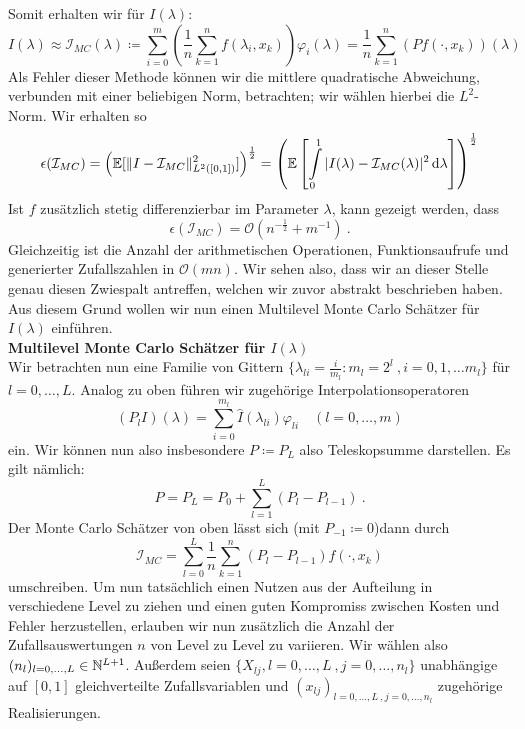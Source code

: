 \begin{Beispiel}
	Somit erhalten wir für $ I(\lambda) $:
	\[
		I(\lambda) \approx \mathcal{I}_{MC}(\lambda) \coloneqq \sum_{i=0}^{m} \left( \frac{1}{n}\sum_{k=1}^{n} f(\lambda_i, x_k)\right) \varphi_i (\lambda) = \frac{1}{n} \sum_{k=1}^{n} (Pf(\cdot,x_k))(\lambda)
	\]
	Als Fehler dieser Methode können wir die mittlere quadratische Abweichung, verbunden mit einer beliebigen Norm, betrachten; wir wählen hierbei die $ L^2 $-Norm.
	Wir erhalten so 
	\[ 
	\epsilon(\mathcal{I}_{MC})  = \left( \mathbb{E} [\lVert I -  \mathcal{I}_{MC} \rVert_{L^2([0,1])}^2] \right)^{\frac{1}{2}} = \left( \mathbb{E} \left[ \int\limits_{0}^{1} | I(\lambda) - \mathcal{I}_{MC}(\lambda) |^2 \, \mathrm{d} \lambda \right] \right)^{\frac{1}{2}}
	\]
	Ist $ f $ zusätzlich stetig differenzierbar im Parameter $ \lambda $, kann gezeigt werden, dass 
	\[
		\epsilon(\mathcal{I}_{MC}) = \mathcal{O}(n^{-\frac{1}{2}}+m^{-1}) \ .
	\]
	Gleichzeitig ist die Anzahl der arithmetischen Operationen, Funktionsaufrufe und generierter Zufallszahlen in $ \mathcal{O}(mn) $.
	Wir sehen also, dass wir an dieser Stelle genau diesen Zwiespalt antreffen, welchen wir zuvor abstrakt beschrieben haben. Aus diesem Grund wollen wir nun einen Multilevel Monte Carlo Schätzer für $ I(\lambda) $ einführen.\\	
	\newline
	\textbf{Multilevel Monte Carlo Schätzer für $ I(\lambda) $}\\
	Wir betrachten nun eine Familie von Gittern $ \{ \lambda_{li} = \frac{i}{m_l} : m_l = 2^l \ , i=0,1,\dots m_l \} $ für $ l = 0,\dots,L $.
	Analog zu oben führen wir zugehörige Interpolationsoperatoren 
	\[
	 (P_l I)(\lambda) = \sum_{i=0}^{m_l} \hat{I}(\lambda_{li}) \varphi_{li} \quad (l = 0,\dots,m)
	 \]
	 ein. Wir können nun also insbesondere $ P \coloneqq P_L $ also Teleskopsumme darstellen. Es gilt nämlich:
	 \[
	 	P = P_L = P_0 + \sum_{l=1}^{L} (P_l-P_{l-1}) \ .
	 \]
	 Der Monte Carlo Schätzer von oben lässt sich (mit $ P_{-1} \coloneqq 0 $)dann durch 
	 \[	
	 \mathcal{I}_{MC} = \sum\limits_{l=0}^{L} \frac{1}{n} \sum\limits_{k=1}^{n} (P_l-P_{l-1})f(\cdot,x_k)	
	 \]
	  umschreiben. Um nun tatsächlich einen Nutzen aus der Aufteilung in verschiedene Level zu ziehen und einen guten Kompromiss zwischen Kosten und Fehler herzustellen, erlauben wir nun zusätzlich die Anzahl der Zufallsauswertungen $ n $ von Level zu Level zu variieren. 
	  Wir wählen also $ (n_l)_{l=0,\dots,L} \in \mathbb{N}^{L+1}  $.  Außerdem seien $ \{ X_{lj} , l=0,\dots,L \ , j= 0,\dots,n_l\} $ unabhängige auf $ [0,1] $ gleichverteilte Zufallsvariablen und $ (x_{lj})_{l=0,\dots,L \ ,j=0,\dots,n_l} $ zugehörige Realisierungen.

\end{Beispiel}
